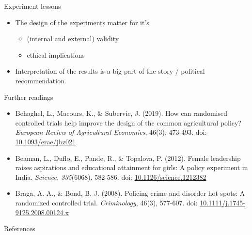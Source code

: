 \documentclass[aspectratio=169]{beamer}
\begin{document}
	\begin{frame}{Experiment lessons}
		\begin{itemize}
			\item The design of the experiments matter for it's
			\begin{itemize}
				 \item (internal and external) validity
				 \item ethical implications
			\end{itemize}
			\item Interpretation of the results is a big part of the story / political recommendation.
		\end{itemize}
	\end{frame}
	\begin{frame}{Further readings}
		\footnotesize
		\begin{itemize}
			\item Behaghel, L., Macours, K., \& Subervie, J. (2019). How can randomised controlled trials help improve the design of the common agricultural policy?  \textit{European Review of Agricultural Economics}, 46(3), 473-493. doi: \href{https://doi.org/10.1093/erae/jbz021}{10.1093/erae/jbz021}
			\item Beaman, L., Duflo, E., Pande, R., \& Topalova, P. (2012). Female leadership raises aspirations and educational attainment for girls: A policy experiment in India. \textit{Science, 335}(6068), 582-586. doi: \href{https://doi.org/10.1126/science.1212382}{10.1126/science.1212382}
			\item Braga, A. A., \& Bond, B. J. (2008). Policing crime and disorder hot spots: A randomized controlled trial.  \textit{Criminology}, 46(3), 577-607. doi: \href{https://doi.org/10.1111/j.1745-9125.2008.00124.x}{10.1111/j.1745-9125.2008.00124.x}
		\end{itemize}
	\end{frame}

	\begin{frame}[t, allowframebreaks]{References}
	  \printbibliography
	\end{frame}

%
\end{document}
